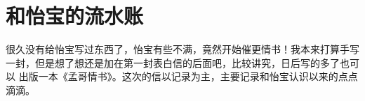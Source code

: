\documentclass[cn,11pt,chinese]{elegantbook}
\begin{document}
\chapter{和怡宝的流水账}
很久没有给怡宝写过东西了，怡宝有些不满，竟然开始催更情书！我本来打算手写
一封，但是想了想还是加在第一封表白信的后面吧，比较讲究，日后写的多了也可以
出版一本《孟哥情书》。这次的信以记录为主，主要记录和怡宝认识以来的点点滴滴。

\begin{figure}[htb]

\end{figure}
\end{document}
